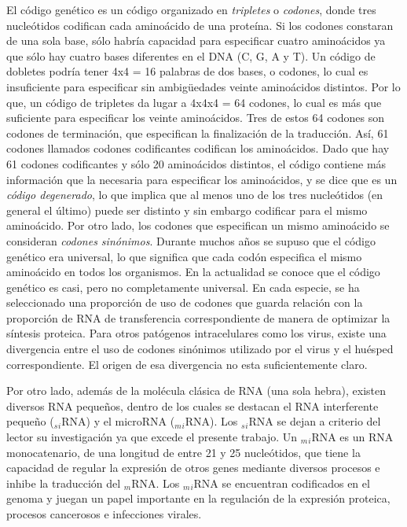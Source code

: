 \par El código genético es un código organizado en \emph{tripletes} o \emph{codones}, donde tres nucleótidos codifican cada aminoácido de una proteína.
Si los codones constaran de una sola base, sólo habría capacidad para especificar cuatro aminoácidos ya que sólo hay cuatro bases diferentes en el DNA (C, G, A y T). Un código de dobletes podría tener 4x4 = 16 palabras de dos bases, o codones, lo cual es insuficiente para especificar sin ambigüedades veinte aminoácidos distintos. Por lo que, un código de tripletes da lugar a 4x4x4 = 64 codones, lo cual es más que suficiente para especificar los veinte aminoácidos\cite{genetica}. Tres de estos 64 codones son codones de terminación, que especifican la finalización de la traducción. Así, 61 codones llamados codones codificantes codifican los aminoácidos. Dado que hay 61 codones codificantes y sólo 20 aminoácidos distintos, el código contiene más información que la necesaria para especificar los aminoácidos, y se dice que es un \emph{código degenerado}, lo que implica que al menos uno de los tres nucleótidos (en general el último) puede ser distinto y sin embargo codificar para el mismo aminoácido\cite{genetica2}. Por otro lado, los codones que especifican un mismo aminoácido se consideran \emph{codones sinónimos}. Durante muchos años se supuso que el código genético era universal, lo que significa que cada codón especifica el mismo aminoácido en todos los organismos. En la actualidad se conoce que el código genético es casi, pero no completamente universal. En cada especie, se ha seleccionado una proporción de uso de codones que guarda relación con la proporción de RNA de transferencia correspondiente de manera de optimizar la síntesis proteica. Para otros patógenos intracelulares como los virus, existe una divergencia entre el uso de codones sinónimos\cite{holme} utilizado por el virus y el huésped correspondiente. El origen de esa divergencia no esta suficientemente claro.

\par Por otro lado, además de la molécula clásica de RNA (una sola hebra), existen diversos RNA pequeños, dentro de los cuales se destacan el RNA interferente pequeño ($_s$$_i$RNA) y el microRNA ($_m$$_i$RNA). Los $_s$$_i$RNA se dejan a criterio del lector su investigación ya que excede el presente trabajo.
Un $_m$$_i$RNA \cite{miRNA}\cite{miRNA2} es un RNA monocatenario, de una longitud de entre 21 y 25 nucleótidos, que tiene la capacidad de regular la expresión de otros genes mediante diversos procesos e inhibe la traducción del $_m$RNA. Los $_m$$_i$RNA se encuentran codificados en el genoma y juegan un papel importante en la regulación de la expresión proteica, procesos cancerosos e infecciones virales. 


